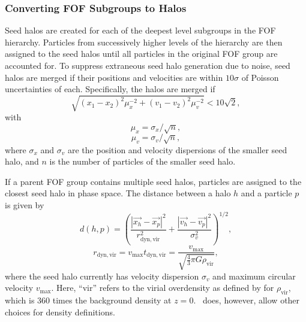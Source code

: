 \subsubsection{Converting FOF Subgroups to Halos}
\label{subsubsec:rockstar--halo_finding--fof_to_halos}


Seed halos are created for each of the deepest level subgroups in the FOF hierarchy.  Particles from successively higher levels of the hierarchy are then assigned to the seed halos until all particles in the original FOF group are accounted for.  To suppress extraneous seed halo generation due to noise, seed halos are merged if their positions and velocities are within $10 \sigma$ of Poisson uncertainties of each.  Specifically, the halos are merged if
\begin{equation}
	\sqrt{(x_{1} - x_{2})^{2} \mu_{x}^{-2} + (v_{1} - v_{2})^{2} \mu_{v}^{-2}} < 10 \sqrt{2},
\end{equation}
with
\begin{equation}
	\mu_{x} = \sigma_{x} / \sqrt{n},
\end{equation}
\begin{equation}
	\mu_{v} = \sigma_{v} / \sqrt{n},
\end{equation}
where $\sigma_{x}$ and $\sigma_{v}$ are the position and velocity dispersions of the smaller seed halo, and $n$ is the number of particles of the smaller seed halo.

If a parent FOF group contains multiple seed halos, particles are assigned to the closest seed halo in phase space.  The distance between a halo $h$ and a particle $p$ is given by
\begin{equation} \label{eq:rockstar--halo_phase_space_distance}
	d(h,p) = \left( \frac{\left| \vec{x_{h}} - \vec{x_{p}} \right|^{2}}{r_{\mathrm{dyn, vir}}^{2}} + \frac{\left| \vec{v_{h}} - \vec{v_{p}} \right|^{2}}{\sigma_{v}^{2}} \right)^{1/2},
\end{equation}
\begin{equation}
	r_{\mathrm{dyn, vir}} = v_{\max} t_{\mathrm{dyn, vir}} = \frac{v_{\max}}{\sqrt{\frac{4}{3} \pi G \rho_{\mathrm{vir}}}},
\end{equation}
where the seed halo currently has velocity dispersion $\sigma_{v}$ and maximum circular velocity $v_{\max}$.  Here, ``vir'' refers to the virial overdensity as defined by \citet{1998ApJ...495...80B} for $\rho_{\mathrm{vir}}$, which is 360 times the background density at $z = 0$.  \rockstar\ does, however, allow other choices for density definitions.



